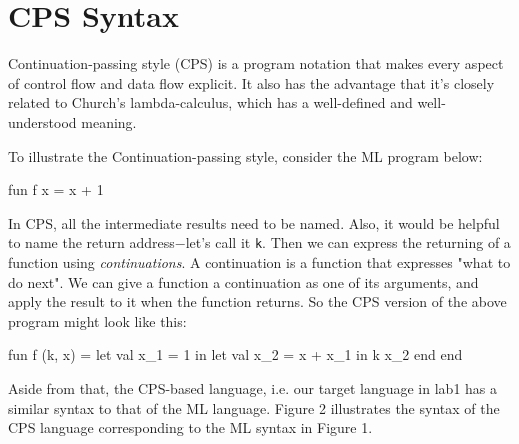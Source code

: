 \documentclass{article}
\theoremstyle{definition}
\theoremstyle{remark}
\numberwithin{equation}{section}
\begin{document}



\section{CPS Syntax}

Continuation-passing style (CPS) is a program notation that makes every
aspect of control flow and data flow explicit. It also has the advantage
 that it's closely related to Church's lambda-calculus, which has a well-defined
  and well-understood meaning.

To illustrate the Continuation-passing style, consider the ML program below:
\begin{code}
fun f x =
    x + 1
\end{code}


In CPS, all the intermediate results need to be named. Also, it would be
helpful to name the return address$-$let's call it \texttt{k}. Then we can
 express the
returning of a function using \emph{continuations}. A continuation is a
function that expresses "what to do next". We can give a function a
continuation as one of its arguments, and apply the result to it when the
function returns. So the CPS version of the above program might look like this:

\begin{code}
fun f (k, x) =
    let val x\_1 = 1
    in  let val x\_2 = x + x\_1
        in k x\_2
        end
    end
\end{code}

Aside from that, the CPS-based language, i.e. our target language
in lab1 has a similar syntax to that of the ML language. Figure 2
 illustrates the syntax of the CPS language corresponding
to the ML syntax in Figure 1.
\end{document}
